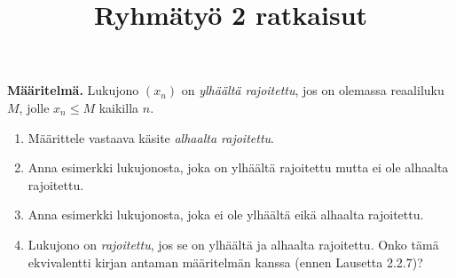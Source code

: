 \documentclass[12pt,a4paper]{article}
\title{Ryhmätyö 2 ratkaisut}
\author{}
\date{}
\begin{document}
\maketitle

\noindent

\begin{exercise}
  \textbf{Määritelmä.} Lukujono $(x_n)$ on \emph{ylhäältä rajoitettu}, jos on
  olemassa reaaliluku $M$, jolle $x_n \leq M$ kaikilla $n$.
\begin{enumerate}[label=\alph*), nosep]
  \item Määrittele vastaava käsite \emph{alhaalta rajoitettu}.
  \item Anna esimerkki lukujonosta, joka on ylhäältä rajoitettu mutta ei ole
    alhaalta rajoitettu.
  \item Anna esimerkki lukujonosta, joka ei ole ylhäältä eikä alhaalta
    rajoitettu.
  \item Lukujono on \emph{rajoitettu}, jos se on ylhäältä ja alhaalta
    rajoitettu. Onko tämä ekvivalentti kirjan antaman määritelmän kanssa
    (ennen Lausetta 2.2.7)?
\end{enumerate}
\end{exercise}
\end{document}
